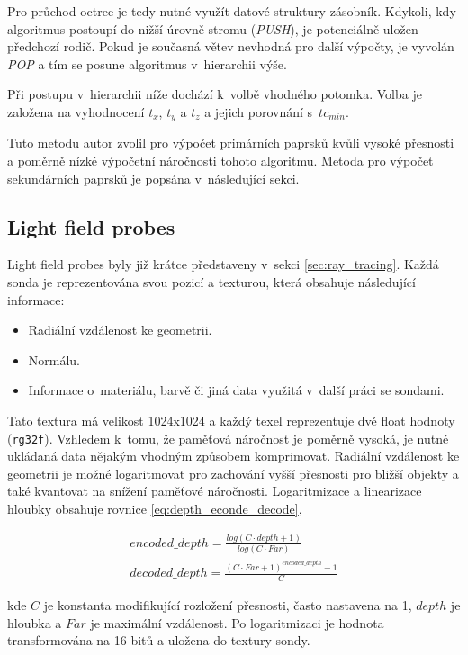 Pro průchod octree je tedy nutné využít datové struktury zásobník. Kdykoli, kdy algoritmus postoupí do nižší úrovně stromu (\textit{PUSH}), je potenciálně uložen předchozí rodič. Pokud je současná větev nevhodná pro další výpočty, je vyvolán \textit{POP} a tím se posune algoritmus v~hierarchii výše. 

Při postupu v~hierarchii níže dochází k~volbě vhodného potomka. Volba je založena na vyhodnocení $t_x$, $t_y$ a $t_z$ a jejich porovnání s~$tc_{min}$.

Tuto metodu autor zvolil pro výpočet primárních paprsků kvůli vysoké přesnosti a poměrně nízké výpočetní náročnosti tohoto algoritmu. Metoda pro výpočet sekundárních paprsků je popsána v~následující sekci.



\subsection{Light field probes}\label{sec:lfp_design}
Light field probes byly již krátce představeny v~sekci \ref{sec:ray_tracing}. Každá sonda je reprezentována svou pozicí a texturou, která obsahuje následující informace:
\begin{itemize}
 \item Radiální vzdálenost ke geometrii.
 \item Normálu.
 \item Informace o~materiálu, barvě či jiná data využitá v~další práci se sondami.
\end{itemize}

Tato textura má velikost 1024x1024 a každý texel reprezentuje dvě float hodnoty (\texttt{rg32f}). Vzhledem k~tomu, že paměťová náročnost je poměrně vysoká, je nutné ukládaná data nějakým vhodným způsobem komprimovat. Radiální vzdálenost ke geometrii je možné logaritmovat pro zachování vyšší přesnosti pro bližší objekty a také kvantovat na snížení paměťové náročnosti. Logaritmizace a linearizace hloubky obsahuje rovnice \ref{eq:depth_econde_decode},

\begin{equation} \label{eq:depth_econde_decode}
	\begin{gathered}
		encoded\_depth = \frac{log(C \cdot depth + 1)}{log(C \cdot Far)}\\
		decoded\_depth = \frac{(C \cdot Far + 1)^{encoded\_depth} - 1}{C}
	\end{gathered}
\end{equation}

kde $C$ je konstanta modifikující rozložení přesnosti, často nastavena na 1, $depth$ je hloubka a $Far$ je maximální vzdálenost. Po logaritmizaci je hodnota transformována na 16 bitů a uložena do textury sondy.

